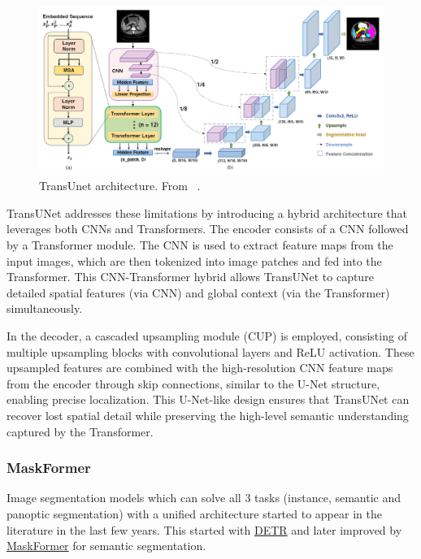 \begin{figure}[t]
    \centering
     \includegraphics[width=0.9\linewidth]{images/transUnet_arch.png}
  
     \caption{TransUnet architecture. From ~\cite{chen2021transunettransformersmakestrong}.}
     \label{fig:transunet}
\end{figure}

TransUNet addresses these limitations by introducing a hybrid architecture that leverages both CNNs and Transformers. The encoder consists of a CNN followed by a Transformer module. The CNN is used to extract feature maps from the input images, which are then tokenized into image patches and fed into the Transformer. This CNN-Transformer hybrid allows TransUNet to capture detailed spatial features (via CNN) and global context (via the Transformer) simultaneously.

In the decoder, a cascaded upsampling module (CUP) is employed, consisting of multiple upsampling blocks with convolutional layers and ReLU activation. These upsampled features are combined with the high-resolution CNN feature maps from the encoder through skip connections, similar to the U-Net structure, enabling precise localization. This U-Net-like design ensures that TransUNet can recover lost spatial detail while preserving the high-level semantic understanding captured by the Transformer.
\subsubsection{MaskFormer}
Image segmentation models which can solve all 3 tasks (instance, semantic and panoptic segmentation) with a unified architecture started to appear in the literature in the last few years. This started with \underline{DETR} \cite{carion2020endtoendobjectdetectiontransformers} and later improved by \underline{MaskFormer} \cite{cheng2021perpixelclassificationneedsemantic} for semantic segmentation.

